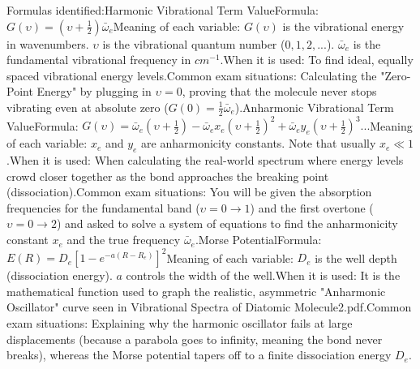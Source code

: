 \documentclass[11pt, a4paper]{report}
\begin{document}
Formulas identified:Harmonic Vibrational Term ValueFormula: $G(\upsilon) = (\upsilon + \frac{1}{2})\bar{\omega}_e$Meaning of each variable: $G(\upsilon)$ is the vibrational energy in wavenumbers. $\upsilon$ is the vibrational quantum number ($0, 1, 2, ...$). $\bar{\omega}_e$ is the fundamental vibrational frequency in $cm^{-1}$.When it is used: To find ideal, equally spaced vibrational energy levels.Common exam situations: Calculating the "Zero-Point Energy" by plugging in $\upsilon = 0$, proving that the molecule never stops vibrating even at absolute zero ($G(0) = \frac{1}{2}\bar{\omega}_e$).Anharmonic Vibrational Term ValueFormula: $G(\upsilon) = \bar{\omega}_e(\upsilon + \frac{1}{2}) - \bar{\omega}_e x_e(\upsilon + \frac{1}{2})^2 + \bar{\omega}_e y_e(\upsilon + \frac{1}{2})^3 ...$Meaning of each variable: $x_e$ and $y_e$ are anharmonicity constants. Note that usually $x_e \ll 1$.When it is used: When calculating the real-world spectrum where energy levels crowd closer together as the bond approaches the breaking point (dissociation).Common exam situations: You will be given the absorption frequencies for the fundamental band ($\upsilon=0 \to 1$) and the first overtone ($\upsilon=0 \to 2$) and asked to solve a system of equations to find the anharmonicity constant $x_e$ and the true frequency $\bar{\omega}_e$.Morse PotentialFormula: $E(R) = D_e [1 - e^{-a(R - R_e)}]^2$Meaning of each variable: $D_e$ is the well depth (dissociation energy). $a$ controls the width of the well.When it is used: It is the mathematical function used to graph the realistic, asymmetric "Anharmonic Oscillator" curve seen in Vibrational Spectra of Diatomic Molecule2.pdf.Common exam situations: Explaining why the harmonic oscillator fails at large displacements (because a parabola goes to infinity, meaning the bond never breaks), whereas the Morse potential tapers off to a finite dissociation energy $D_e$.
\end{document}
